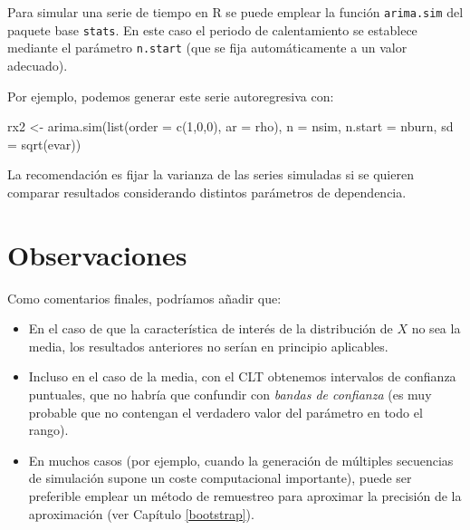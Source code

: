 \documentclass[
]{book}
\newenvironment{Shaded}{\begin{snugshade}}{\end{snugshade}}
\newcommand{\AttributeTok}[1]{\textcolor[rgb]{0.77,0.63,0.00}{#1}}
\newcommand{\DecValTok}[1]{\textcolor[rgb]{0.00,0.00,0.81}{#1}}
\newcommand{\FunctionTok}[1]{\textcolor[rgb]{0.00,0.00,0.00}{#1}}
\newcommand{\NormalTok}[1]{#1}
\newcommand{\OtherTok}[1]{\textcolor[rgb]{0.56,0.35,0.01}{#1}}
\theoremstyle{break}
\theoremstyle{nonumberplain}
\begin{document}
Para simular una serie de tiempo en R se puede emplear la función \texttt{arima.sim} del paquete base \texttt{stats}.
En este caso el periodo de calentamiento se establece mediante el parámetro \texttt{n.start} (que se fija automáticamente a un valor adecuado).

Por ejemplo, podemos generar este serie autoregresiva con:

\begin{Shaded}
\begin{Highlighting}[]
\NormalTok{rx2 }\OtherTok{\textless{}{-}} \FunctionTok{arima.sim}\NormalTok{(}\FunctionTok{list}\NormalTok{(}\AttributeTok{order =} \FunctionTok{c}\NormalTok{(}\DecValTok{1}\NormalTok{,}\DecValTok{0}\NormalTok{,}\DecValTok{0}\NormalTok{), }\AttributeTok{ar =}\NormalTok{ rho), }\AttributeTok{n =}\NormalTok{ nsim, }
                 \AttributeTok{n.start =}\NormalTok{ nburn, }\AttributeTok{sd =} \FunctionTok{sqrt}\NormalTok{(evar))}
\end{Highlighting}
\end{Shaded}

La recomendación es fijar la varianza de las series simuladas si se quieren comparar
resultados considerando distintos parámetros de dependencia.

\hypertarget{observaciones}{%
\section{Observaciones}\label{observaciones}}

Como comentarios finales, podríamos añadir que:

\begin{itemize}
\item
  En el caso de que la característica de interés de la distribución de \(X\) no sea la media, los resultados anteriores no serían en principio aplicables.
\item
  Incluso en el caso de la media, con el CLT obtenemos intervalos de confianza puntuales, que no habría que confundir con \emph{bandas de confianza} (es muy probable que no contengan el verdadero valor del parámetro en todo el rango).
\item
  En muchos casos (por ejemplo, cuando la generación de múltiples secuencias de simulación supone un coste computacional importante), puede ser preferible emplear un método de remuestreo para aproximar la precisión de la aproximación (ver Capítulo \ref{bootstrap}).
\end{itemize}
\end{document}
